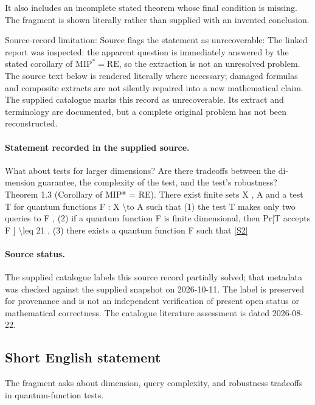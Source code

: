 \documentclass[11pt]{article}
\begin{document}
It also includes an incomplete stated theorem whose final condition is missing. The fragment is shown literally rather than supplied with an invented conclusion.

Source-record limitation: Source flags the statement as unrecoverable: The linked report was inspected: the apparent question is immediately answered by the stated corollary of $\mathrm{MIP}^*=\mathrm{RE}$, so the extraction is not an unresolved problem.
The source text below is rendered literally where necessary; damaged formulas and composite extracts are not silently repaired into a new mathematical claim.
The supplied catalogue marks this record as unrecoverable. Its extract and terminology are documented, but a complete original problem has not been reconstructed.
\paragraph{Statement recorded in the supplied source.}
What about tests for larger dimensions? Are there tradeoffs between the di- mension guarantee, the complexity of the test, and the test’s robustness? Theorem 1.3 (Corollary of MIP* = RE). There exist finite sets X , A and a test T for quantum functions F : X \textbackslash{}to A such that (1) the test T makes only two queries to F , (2) if a quantum function F is finite dimensional, then Pr[T accepts F ] \textbackslash{}leq 21 , (3) there exists a quantum function F such that \href{https://doi.org/10.4171/owr/2021/54}{[S2]}
\paragraph{Source status.}
The supplied catalogue labels this source record partially solved; that metadata was checked against the supplied snapshot on 2026-10-11. The label is preserved for provenance and is not an independent verification of present open status or mathematical correctness. The catalogue literature assessment is dated 2026-08-22.
\subsection{Short English statement}
The fragment asks about dimension, query complexity, and robustness tradeoffs in quantum-function tests.
\end{document}
